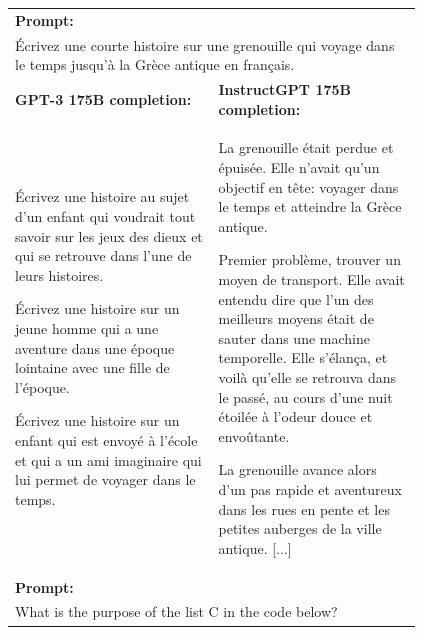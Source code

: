 \begin{figure}[tp]
    \centering
    \footnotesize
    \begin{tabular}{p{0.48\linewidth} p{0.48\linewidth}}
    \toprule
    \multicolumn{2}{l}{\textbf{Prompt:} }  \\
    \multicolumn{2}{p{0.95\linewidth}}{
        Écrivez une courte histoire sur une grenouille qui voyage dans le temps jusqu'à la Grèce antique en français.
    }  \\
    \midrule
    \textbf{GPT-3 175B completion:} & \textbf{InstructGPT 175B completion:} \\
        Écrivez une histoire au sujet d'un enfant qui voudrait tout savoir sur les jeux des dieux et qui se retrouve dans l'une de leurs histoires.
        
        \vspace{5pt}Écrivez une histoire sur un jeune homme qui a une aventure dans une époque lointaine avec une fille de l'époque.
        
        \vspace{5pt}Écrivez une histoire sur un enfant qui est envoyé à l'école et qui a un ami imaginaire qui lui permet de voyager dans le temps.
    &
        La grenouille était perdue et épuisée. Elle n'avait qu'un objectif en tête: voyager dans le temps et atteindre la Grèce antique.
        
        \vspace{5pt}Premier problème, trouver un moyen de transport. Elle avait entendu dire que l'un des meilleurs moyens était de sauter dans une machine temporelle. Elle s'élança, et voilà qu'elle se retrouva dans le passé, au cours d'une nuit étoilée à l'odeur douce et envoûtante.
        
        \vspace{5pt}La grenouille avance alors d'un pas rapide et aventureux dans les rues en pente et les petites auberges de la ville antique.  [...] \\
        
    \midrule[\heavyrulewidth]

    \multicolumn{2}{l}{\textbf{Prompt:} }  \\
    \multicolumn{2}{p{0.95\linewidth}}{
        \begin{minipage}{\linewidth}
        What is the purpose of the list C in the code below?
        

\end{minipage}}
\end{tabular}
\end{figure}
